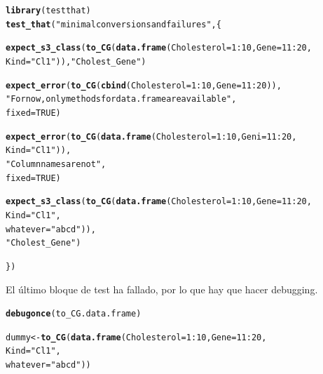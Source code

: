 \documentclass{config/apuntes}\usepackage[]{graphicx}\usepackage[]{xcolor}
\makeatletter
\newcommand{\hlnum}[1]{\textcolor[rgb]{0.686,0.059,0.569}{#1}}%
\newcommand{\hlsng}[1]{\textcolor[rgb]{0.192,0.494,0.8}{#1}}%
\newcommand{\hlopt}[1]{\textcolor[rgb]{0,0,0}{#1}}%
\newcommand{\hldef}[1]{\textcolor[rgb]{0.345,0.345,0.345}{#1}}%
\newcommand{\hlkwb}[1]{\textcolor[rgb]{0.69,0.353,0.396}{#1}}%
\newcommand{\hlkwc}[1]{\textcolor[rgb]{0.333,0.667,0.333}{#1}}%
\newcommand{\hlkwd}[1]{\textcolor[rgb]{0.737,0.353,0.396}{\textbf{#1}}}%
\newenvironment{kframe}{%
 \def\at@end@of@kframe{}%
 \ifinner\ifhmode%
  \def\at@end@of@kframe{\end{minipage}}%
  \begin{minipage}{\columnwidth}%
 \fi\fi%
 \def\FrameCommand##1{\hskip\@totalleftmargin \hskip-\fboxsep
 \colorbox{shadecolor}{##1}\hskip-\fboxsep
     \hskip-\linewidth \hskip-\@totalleftmargin \hskip\columnwidth}%
 \MakeFramed {\advance\hsize-\width
   \@totalleftmargin\z@ \linewidth\hsize
   \@setminipage}}%
 {\par\unskip\endMakeFramed%
 \at@end@of@kframe}
\newenvironment{knitrout}{}{} %
\makeatother
\begin{document}
\begin{knitrout}
\color{fgcolor}\begin{kframe}
\begin{alltt}
\hlkwd{library}\hldef{(testthat)}
\hlkwd{test_that}\hldef{(}\hlsng{"minimal conversions and failures"}\hldef{, \{}

    \hlkwd{expect_s3_class}\hldef{(}\hlkwd{to_CG}\hldef{(}\hlkwd{data.frame}\hldef{(}\hlkwc{Cholesterol} \hldef{=} \hlnum{1}\hlopt{:}\hlnum{10}\hldef{,} \hlkwc{Gene} \hldef{=} \hlnum{11}\hlopt{:}\hlnum{20}\hldef{,}
                                     \hlkwc{Kind} \hldef{=} \hlsng{"Cl1"}\hldef{)),} \hlsng{"Cholest_Gene"}\hldef{)}


    \hlkwd{expect_error}\hldef{(}\hlkwd{to_CG}\hldef{(}\hlkwd{cbind}\hldef{(}\hlkwc{Cholesterol} \hldef{=} \hlnum{1}\hlopt{:}\hlnum{10}\hldef{,} \hlkwc{Gene} \hldef{=} \hlnum{11}\hlopt{:}\hlnum{20}\hldef{)),}
                 \hlsng{"For now, only methods for data.frame are available"}\hldef{,}
                 \hlkwc{fixed} \hldef{=} \hlnum{TRUE}\hldef{)}

    \hlkwd{expect_error}\hldef{(}\hlkwd{to_CG}\hldef{(}\hlkwd{data.frame}\hldef{(}\hlkwc{Cholesterol} \hldef{=} \hlnum{1}\hlopt{:}\hlnum{10}\hldef{,} \hlkwc{Geni} \hldef{=} \hlnum{11}\hlopt{:}\hlnum{20}\hldef{,}
                                     \hlkwc{Kind} \hldef{=} \hlsng{"Cl1"}\hldef{)),}
                 \hlsng{"Column names are not "}\hldef{,}
                 \hlkwc{fixed} \hldef{=} \hlnum{TRUE}\hldef{)}

    \hlkwd{expect_s3_class}\hldef{(}\hlkwd{to_CG}\hldef{(}\hlkwd{data.frame}\hldef{(}\hlkwc{Cholesterol} \hldef{=} \hlnum{1}\hlopt{:}\hlnum{10}\hldef{,} \hlkwc{Gene} \hldef{=} \hlnum{11}\hlopt{:}\hlnum{20}\hldef{,}
                                     \hlkwc{Kind} \hldef{=} \hlsng{"Cl1"}\hldef{,}
                                     \hlkwc{whatever} \hldef{=} \hlsng{"abcd"}\hldef{)),}
                    \hlsng{"Cholest_Gene"}\hldef{)}

\hldef{\})}
\end{alltt}
\end{kframe}
\end{knitrout}

El último bloque de test ha fallado, por lo que hay que hacer debugging. 
\begin{knitrout}
\color{fgcolor}\begin{kframe}
\begin{alltt}
\hlkwd{debugonce}\hldef{(to_CG.data.frame)}

\hldef{dummy} \hlkwb{<-} \hlkwd{to_CG}\hldef{(}\hlkwd{data.frame}\hldef{(}\hlkwc{Cholesterol} \hldef{=} \hlnum{1}\hlopt{:}\hlnum{10}\hldef{,} \hlkwc{Gene} \hldef{=} \hlnum{11}\hlopt{:}\hlnum{20}\hldef{,}
                                 \hlkwc{Kind} \hldef{=} \hlsng{"Cl1"}\hldef{,}
                                 \hlkwc{whatever} \hldef{=} \hlsng{"abcd"}\hldef{))}
\end{alltt}
\end{kframe}
\end{knitrout}
\end{document}
